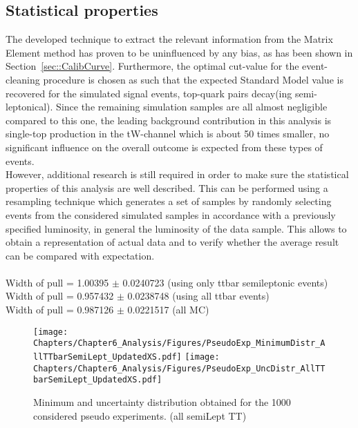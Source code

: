 \subsection{Statistical properties}
The developed technique to extract the relevant information from the Matrix Element method has proven to be uninfluenced by any bias, as has been shown in Section~\ref{sec::CalibCurve}.
Furthermore, the optimal cut-value for the event-cleaning procedure is chosen as such that the expected Standard Model value is recovered for the simulated signal events, top-quark pairs decay(ing semi-leptonical). Since the remaining simulation samples are all almost negligible compared to this one, the leading background contribution in this analysis is single-top production in the tW-channel which is about 50 times smaller, no significant influence on the overall outcome is expected from these types of events.
\\

However, additional research is still required in order to make sure the statistical properties of this analysis are well described.
This can be performed using a resampling technique which generates a set of samples by randomly selecting events from the considered simulated samples in accordance with a previously specified luminosity, in general the luminosity of the data sample.
This allows to obtain a representation of actual data and to verify whether the average result can be compared with expectation.
\\
\\
Width of pull = 1.00395 $\pm$ 0.0240723 (using only ttbar semileptonic events)\\
Width of pull = 0.957432 $\pm$ 0.0238748 (using all ttbar events)\\
Width of pull = 0.987126 $\pm$ 0.0221517 (all MC)

\begin{figure}[h!t]
 \centering
 \texttt{[image: Chapters/Chapter6\_Analysis/Figures/PseudoExp\_MinimumDistr\_AllTTbarSemiLept\_UpdatedXS.pdf]}
 \texttt{[image: Chapters/Chapter6\_Analysis/Figures/PseudoExp\_UncDistr\_AllTTbarSemiLept\_UpdatedXS.pdf]}
 \caption{Minimum and uncertainty distribution obtained for the 1000 considered pseudo experiments. (all semiLept TT)}  \label{fig::MinAndUnc}
\end{figure}

